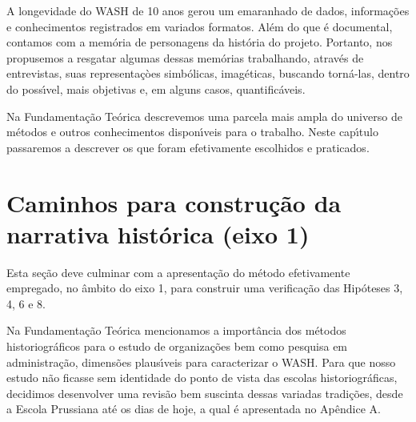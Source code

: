 \documentclass[
12pt,		%
openright,	%
twoside,  %
a4paper,			%
chapter=TITLE,		%
english,			%
french,				%
spanish,			%
brazil				%
]{USPSC-classe/USPSC}
\begin{document}
A longevidade do WASH de 10 anos gerou um emaranhado de dados, informa\c{c}\~oes e conhecimentos registrados em variados formatos. Al\'em do que \'e documental, contamos com a mem\'oria de personagens da hist\'oria do projeto. Portanto, nos propusemos a resgatar algumas dessas mem\'orias trabalhando, atrav\'es de entrevistas, suas representa\c{c}òes simb\'olicas, imag\'eticas, buscando torn\'a-las, dentro do poss\'{\i}vel, mais objetivas e, em alguns casos, quantific\'aveis.

















Na Fundamenta\c{c}\~ao Te\'orica descrevemos uma parcela mais ampla do universo de m\'etodos e outros conhecimentos dispon\'{\i}veis para o trabalho. Neste cap\'{\i}tulo passaremos a descrever os que foram efetivamente escolhidos e praticados.

















\section[Caminhos para constru\c{c}\~ao da narrativa hist\'orica (eixo 1)]{Caminhos para constru\c{c}\~ao da narrativa hist\'orica (eixo 1)}\label{Caminhos para constru\c{c}\~ao da narrativa hist\'orica (eixo 1)}
Esta se\c{c}\~ao deve culminar com a apresenta\c{c}\~ao do m\'etodo efetivamente empregado, no \^ambito do eixo 1, para construir uma verifica\c{c}\~ao das Hip\'oteses 3, 4, 6 e 8.

















Na Fundamenta\c{c}\~ao Te\'orica mencionamos a import\^ancia dos m\'etodos historiogr\'aficos para o estudo de organiza\c{c}\~oes bem como pesquisa em administra\c{c}\~ao, dimens\~oes plaus\'{\i}veis para caracterizar o WASH. Para que nosso estudo n\~ao ficasse sem identidade do ponto de vista das escolas historiogr\'aficas, decidimos desenvolver uma revis\~ao bem suscinta dessas variadas tradi\c{c}\~oes, desde a Escola Prussiana at\'e os dias de hoje, a qual \'e apresentada no Ap\^endice A.
\end{document}
